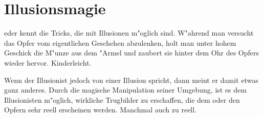 \section{Illusionsmagie}
\label{illusionsmagie}
eder kennt die Tricks,
die mit Illusionen m"oglich sind. W"ahrend man versucht das Opfer vom eigentlichen
Geschehen abzulenken, holt man unter hohem Geschick die M"unze aus dem "Armel und
\glqq zaubert\grqq{} sie hinter dem Ohr des Opfers wieder hervor. Kinderleicht.

\par Wenn der Illusionist jedoch von einer Illusion spricht, dann meint er damit
etwas ganz anderes. Durch die magische Manipulation seiner Umgebung, ist es dem
Illusionisten m"oglich, wirkliche Trugbilder zu erschaffen, die dem oder den
Opfern sehr reell erscheinen werden. Manchmal auch zu reell.
